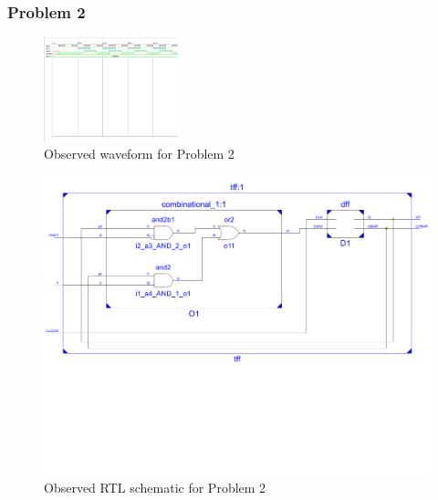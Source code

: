 \documentclass{lab_sheet}
\begin{document}
    \subsubsection*{Problem 2}
    \begin{figure}[H]
        \centering
        \includegraphics[width=.95\linewidth, height=30mm, frame]{../Figures/2.pdf}
        \caption{Observed waveform for Problem 2}
        \label{fig:obs2}
    \end{figure}
    \begin{figure}[H]
        \centering
        \includegraphics[scale=0.5]{../Figures/q2_ckt.pdf}
        \caption{Observed RTL schematic for Problem 2}
        \label{fig:rtl2}
    \end{figure}
\end{document}
